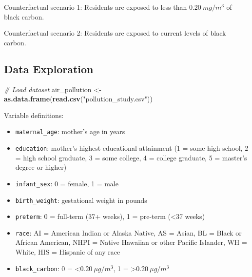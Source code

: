 \documentclass[
]{article}
\newenvironment{Shaded}{\begin{snugshade}}{\end{snugshade}}
\newcommand{\CommentTok}[1]{\textcolor[rgb]{0.56,0.35,0.01}{\textit{#1}}}
\newcommand{\FunctionTok}[1]{\textcolor[rgb]{0.13,0.29,0.53}{\textbf{#1}}}
\newcommand{\NormalTok}[1]{#1}
\newcommand{\OtherTok}[1]{\textcolor[rgb]{0.56,0.35,0.01}{#1}}
\newcommand{\StringTok}[1]{\textcolor[rgb]{0.31,0.60,0.02}{#1}}
\begin{document}
Counterfactual scenario 1: Residents are exposed to less than
\(0.20 \ mg/m^3\) of black carbon.

Counterfactual scenario 2: Residents are exposed to current levels of
black carbon.

\subsection{\texorpdfstring{\textbf{Data
Exploration}}{Data Exploration}}\label{data-exploration}

\begin{Shaded}
\begin{Highlighting}[]
\CommentTok{\# Load dataset}
\NormalTok{air\_pollution }\OtherTok{\textless{}{-}} \FunctionTok{as.data.frame}\NormalTok{(}\FunctionTok{read.csv}\NormalTok{(}\StringTok{"pollution\_study.csv"}\NormalTok{)) }
\end{Highlighting}
\end{Shaded}

Variable definitions:

\begin{itemize}
\item
  \texttt{maternal\_age}: mother's age in years
\item
  \texttt{education}: mother's highest educational attainment (1 = some
  high school, 2 = high school graduate, 3 = some college, 4 = college
  graduate, 5 = master's degree or higher)
\item
  \texttt{infant\_sex}: 0 = female, 1 = male
\item
  \texttt{birth\_weight}: gestational weight in pounds
\item
  \texttt{preterm}: 0 = full-term (37+ weeks), 1 = pre-term (\textless37
  weeks)
\item
  \texttt{race}: AI = American Indian or Alaska Native, AS = Asian, BL =
  Black or African American, NHPI = Native Hawaiian or other Pacific
  Islander, WH = White, HIS = Hispanic of any race
\item
  \texttt{black\_carbon}: 0 = \textless{}\(0.20 \ \mu g/m^3\), 1 =
  \textgreater{}\(0.20 \ \mu g/m^3\)
\end{itemize}
\end{document}
